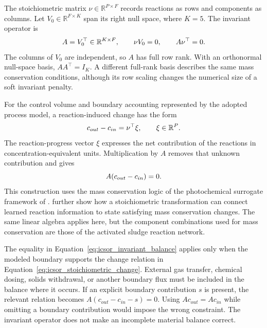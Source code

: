 The stoichiometric matrix \(\nu\in\mathbb{R}^{P\times F}\) records reactions as rows and components as columns. Let \(V_0\in\mathbb{R}^{F\times K}\) span its right null space, where \(K=5\). The invariant operator is
\begin{equation}
\equationname{Structured-regression mass conservation operator from the null space}
\label{eq:icsor_invariant_operator}
A=V_0^\top\in\mathbb{R}^{K\times F},
\qquad \nu V_0=0,
\qquad A\nu^\top=0.
\end{equation}
The columns of \(V_0\) are independent, so \(A\) has full row rank. With an orthonormal null-space basis, \(AA^\top=I_K\). A different full-rank basis describes the same mass conservation conditions, although its row scaling changes the numerical size of a soft invariant penalty.

For the control volume and boundary accounting represented by the adopted process model, a reaction-induced change has the form
\begin{equation}
\equationname{Effluent change in stoichiometric process coordinates}
\label{eq:icsor_stoichiometric_change}
c_{out}-c_{in}=\nu^\top\xi,
\qquad \xi\in\mathbb{R}^{P}.
\end{equation}
The reaction-progress vector \(\xi\) expresses the net contribution of the reactions in concentration-equivalent units. Multiplication by \(A\) removes that unknown contribution and gives
\begin{equation}
\equationname{Mass conservation equality for the structured-regression effluent}
\label{eq:icsor_invariant_balance}
A(c_{out}-c_{in})=0.
\end{equation}
This construction uses the mass conservation logic of the photochemical surrogate framework of \citet{SturmWexler2020}. \citet{SturmWexler2022} further show how a stoichiometric transformation can connect learned reaction information to state satisfying mass conservation changes. The same linear algebra applies here, but the component combinations used for mass conservation are those of the activated sludge reaction network.

The equality in Equation~\eqref{eq:icsor_invariant_balance} applies only when the modeled boundary supports the change relation in Equation~\eqref{eq:icsor_stoichiometric_change}. External gas transfer, chemical dosing, solids withdrawal, or another boundary flux must be included in the balance where it occurs. If an explicit boundary contribution \(s\) is present, the relevant relation becomes \(A(c_{out}-c_{in}-s)=0\). Using \(Ac_{out}=Ac_{in}\) while omitting a boundary contribution would impose the wrong constraint. The invariant operator does not make an incomplete material balance correct.

